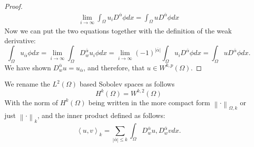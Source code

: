 \documentclass[../Main/main.tex]{subfiles}
\begin{document}
\begin{proof}
\begin{gather*}
			\lim_{i\rightarrow \infty}\int_{\Omega} u_i D^{\overline{\alpha}}\phi dx = \int_{\Omega} u  D^{\overline{\alpha}}\phi dx
		\end{gather*}
		Now we can put the two equations together with the definition of the weak derivative:
		\begin{equation*}
			\int_{\Omega}u_{\overline{\alpha}} \phi dx = \lim_{i\rightarrow \infty} \int_{\Omega} D_w^{\overline{\alpha}}u_i \phi dx = \lim_{i\rightarrow \infty}(-1)^{|\overline{\alpha}|}\int_{\Omega} u_i D^{\overline{\alpha}}\phi dx = \int_{\Omega} u  D^{\overline{\alpha}}\phi dx.
		\end{equation*}
		We have shown $D_w^{\overline{\alpha}}u =  u_{\overline{\alpha}}$, and therefore, that $u\in W^{k,p}(\Omega)$. 
	\end{proof}
	\begin{definition}
		We rename the $L^2(\Omega)$ based Sobolev spaces as follows 
		\begin{equation*}
			H^k(\Omega) = W^{k,2}(\Omega)
		\end{equation*}
		With the norm of $H^k(\Omega)$ being written in the more compact form $\left \| \cdot \right \|_{\Omega,k}$ or just $\left \| \cdot \right \|_{k}$, and the inner product defined as follows:
		\begin{equation*}
			\left \langle u,v \right \rangle_k = \sum_{|\overline{\alpha}| \leq k} \int_{\Omega}D_w^{\overline{\alpha}}u,D_w^{\overline{\alpha}}v dx.
		\end{equation*}
	\end{definition}
\end{document}
